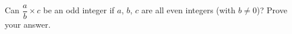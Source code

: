 Can $\dfrac {a}{b}\times c$ be an odd integer if $a$, $b$, $c$ are all even integers (with $b\ne0$)? Prove your answer.
